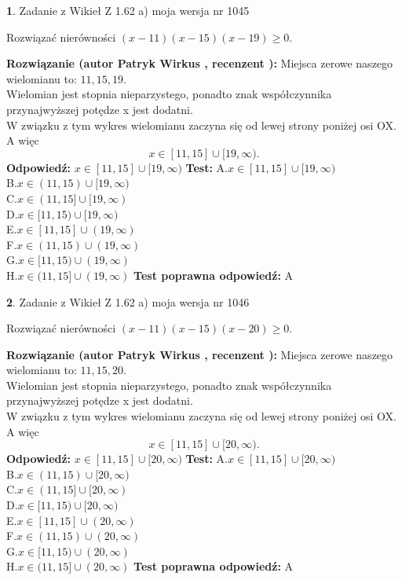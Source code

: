 \documentclass[12pt, a4paper]{article}
\theoremstyle{definition} %
\newtheorem{zad}{}
\newcommand{\zadStart}[1]{\begin{zad}#1\newline}
\newcommand{\zadStop}{\end{zad}}
\newcommand{\rozwStart}[2]{\noindent \textbf{Rozwiązanie (autor #1 , recenzent #2): }\newline}
\newcommand{\rozwStop}{\newline}
\newcommand{\odpStart}{\noindent \textbf{Odpowiedź:}\newline}
\newcommand{\odpStop}{\newline}
\newcommand{\testStart}{\noindent \textbf{Test:}\newline}
\newcommand{\testStop}{\newline}
\newcommand{\kluczStart}{\noindent \textbf{Test poprawna odpowiedź:}\newline}
\newcommand{\kluczStop}{\newline}
\begin{document}
\zadStart{Zadanie z Wikieł Z 1.62 a) moja wersja nr 1045}

Rozwiązać nierówności $(x-11)(x-15)(x-19)\ge0$.
\zadStop
\rozwStart{Patryk Wirkus}{}
Miejsca zerowe naszego wielomianu to: $11, 15, 19$.\\
Wielomian jest stopnia nieparzystego, ponadto znak współczynnika przy\linebreak najwyższej potędze x jest dodatni.\\ W związku z tym wykres wielomianu zaczyna się od lewej strony poniżej osi OX. A więc $$x \in [11,15] \cup [19,\infty).$$
\rozwStop
\odpStart
$x \in [11,15] \cup [19,\infty)$
\odpStop
\testStart
A.$x \in [11,15] \cup [19,\infty)$\\
B.$x \in (11,15) \cup [19,\infty)$\\
C.$x \in (11,15] \cup [19,\infty)$\\
D.$x \in [11,15) \cup [19,\infty)$\\
E.$x \in [11,15] \cup (19,\infty)$\\
F.$x \in (11,15) \cup (19,\infty)$\\
G.$x \in [11,15) \cup (19,\infty)$\\
H.$x \in (11,15] \cup (19,\infty)$
\testStop
\kluczStart
A
\kluczStop



\zadStart{Zadanie z Wikieł Z 1.62 a) moja wersja nr 1046}

Rozwiązać nierówności $(x-11)(x-15)(x-20)\ge0$.
\zadStop
\rozwStart{Patryk Wirkus}{}
Miejsca zerowe naszego wielomianu to: $11, 15, 20$.\\
Wielomian jest stopnia nieparzystego, ponadto znak współczynnika przy\linebreak najwyższej potędze x jest dodatni.\\ W związku z tym wykres wielomianu zaczyna się od lewej strony poniżej osi OX. A więc $$x \in [11,15] \cup [20,\infty).$$
\rozwStop
\odpStart
$x \in [11,15] \cup [20,\infty)$
\odpStop
\testStart
A.$x \in [11,15] \cup [20,\infty)$\\
B.$x \in (11,15) \cup [20,\infty)$\\
C.$x \in (11,15] \cup [20,\infty)$\\
D.$x \in [11,15) \cup [20,\infty)$\\
E.$x \in [11,15] \cup (20,\infty)$\\
F.$x \in (11,15) \cup (20,\infty)$\\
G.$x \in [11,15) \cup (20,\infty)$\\
H.$x \in (11,15] \cup (20,\infty)$
\testStop
\kluczStart
A
\kluczStop
\end{document}
